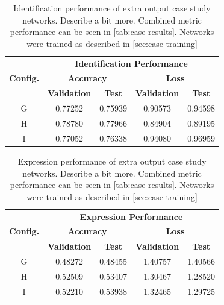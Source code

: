 \begin{table}[h!]
\begin{center}
\begin{tabular}{|c|c|c|c|c|}
\hline
\multirow{3}{*}{\textbf{Config.}} & \multicolumn{4}{|c|}{\textbf{Identification Performance}} \\ \cline{2-5}
& \multicolumn{2}{|c|}{\textbf{Accuracy}} & \multicolumn{2}{|c|}{\textbf{Loss}} \\ \cline{2-5}
& \textbf{Validation} & \textbf{Test} & \textbf{Validation} & \textbf{Test} \\ \hline
G & 0.77252 & 0.75939 & 0.90573 & 0.94598 \\ \hline
H & 0.78780 & 0.77966 & 0.84904 & 0.89195 \\ \hline
I & 0.77052 & 0.76338 & 0.94080 & 0.96959 \\ \hline
\end{tabular}
\end{center}
\caption[Identification performance of extra output case study networks]{Identification performance of extra output case study networks. Describe a bit more. Combined metric performance can be seen in \autoref{tab:case-results}. Networks were trained as described in \autoref{sec:case-training}}
\label{tab:case-results-id}
\end{table}


\begin{table}[h!]
\begin{center}
\begin{tabular}{|c|c|c|c|c|}
\hline
\multirow{3}{*}{\textbf{Config.}} & \multicolumn{4}{|c|}{\textbf{Expression Performance}} \\ \cline{2-5}
& \multicolumn{2}{|c|}{\textbf{Accuracy}} & \multicolumn{2}{|c|}{\textbf{Loss}} \\ \cline{2-5}
& \textbf{Validation} & \textbf{Test} & \textbf{Validation} & \textbf{Test} \\ \hline
G & 0.48272 & 0.48455 & 1.40757 & 1.40566 \\ \hline
H & 0.52509 & 0.53407 & 1.30467 & 1.28520 \\ \hline
I & 0.52210 & 0.53938 & 1.32465 & 1.29725 \\ \hline
\end{tabular}
\end{center}
\caption[Expression performance of extra output case study networks]{Expression performance of extra output case study networks. Describe a bit more. Combined metric performance can be seen in \autoref{tab:case-results}. Networks were trained as described in \autoref{sec:case-training}}
\label{tab:case-results-exp}
\end{table}

